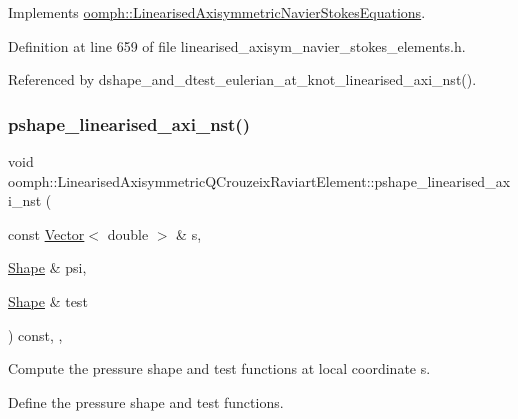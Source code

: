 Implements \hyperlink{classoomph_1_1LinearisedAxisymmetricNavierStokesEquations_a86dd84e88a2f10e33f61b1a09c8aefd7}{oomph\+::\+Linearised\+Axisymmetric\+Navier\+Stokes\+Equations}.



Definition at line 659 of file linearised\+\_\+axisym\+\_\+navier\+\_\+stokes\+\_\+elements.\+h.



Referenced by dshape\+\_\+and\+\_\+dtest\+\_\+eulerian\+\_\+at\+\_\+knot\+\_\+linearised\+\_\+axi\+\_\+nst().

\mbox{\label{classoomph_1_1LinearisedAxisymmetricQCrouzeixRaviartElement_a362d335bf1eeed38461e494645969ad1}} 
\subsubsection{\texorpdfstring{pshape\+\_\+linearised\+\_\+axi\+\_\+nst()}{pshape\_linearised\_axi\_nst()}\hspace{0.1cm}{\footnotesize\ttfamily [2/2]}}
{\footnotesize\ttfamily void oomph\+::\+Linearised\+Axisymmetric\+Q\+Crouzeix\+Raviart\+Element\+::pshape\+\_\+linearised\+\_\+axi\+\_\+nst (\begin{DoxyParamCaption}\item[{const \hyperlink{classoomph_1_1Vector}{Vector}$<$ double $>$ \&}]{s,  }\item[{\hyperlink{classoomph_1_1Shape}{Shape} \&}]{psi,  }\item[{\hyperlink{classoomph_1_1Shape}{Shape} \&}]{test }\end{DoxyParamCaption}) const\hspace{0.3cm}{\ttfamily [inline]}, {\ttfamily [protected]}, {\ttfamily [virtual]}}



Compute the pressure shape and test functions at local coordinate s. 

Define the pressure shape and test functions. 

